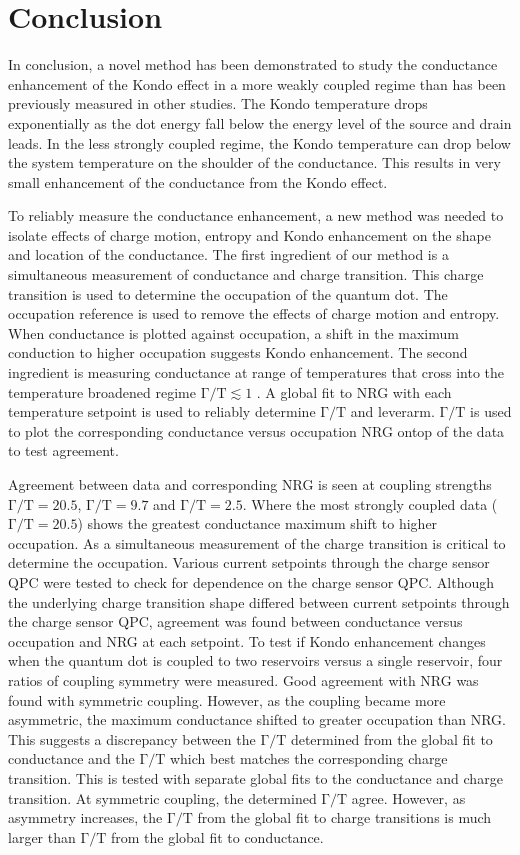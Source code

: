 \chapter{Conclusion}\label{cha:conclusion}


In conclusion, a novel method has been demonstrated to study the conductance enhancement of the Kondo effect in a more weakly coupled regime than has been previously measured in other studies. The Kondo temperature drops exponentially as the dot energy fall below the energy level of the source and drain leads. In the less strongly coupled regime, the Kondo temperature can drop below the system temperature on the shoulder of the conductance. This results in very small enhancement of the conductance from the Kondo effect.

To reliably measure the conductance enhancement, a new method was needed to isolate effects of charge motion, entropy and Kondo enhancement on the shape and location of the conductance. The first ingredient of our method is a simultaneous measurement of conductance and charge transition. This charge transition is used to determine the occupation of the quantum dot. The occupation reference is used to remove the effects of charge motion and entropy. When conductance is plotted against occupation, a shift in the maximum conduction to higher occupation suggests Kondo enhancement. The second ingredient is measuring conductance at range of temperatures that cross into the temperature broadened regime $\mathrm{\Gamma/T} \lesssim 1$ . A global fit to NRG with each temperature setpoint is used to reliably determine $\mathrm{\Gamma/T}$ and leverarm. $\mathrm{\Gamma/T}$ is used to plot the corresponding conductance versus occupation NRG ontop of the data to test agreement. 

Agreement between data and corresponding NRG is seen at coupling strengths $\mathrm{\Gamma/T} = 20.5$, $\mathrm{\Gamma/T} = 9.7$ and $\mathrm{\Gamma/T} = 2.5$. Where the most strongly coupled data ($\mathrm{\Gamma/T} = 20.5$) shows the greatest conductance maximum shift to higher occupation. As a simultaneous measurement of the charge transition is critical to determine the occupation. Various current setpoints through the charge sensor QPC were tested to check for dependence on the charge sensor QPC. Although the underlying charge transition shape differed between current setpoints through the charge sensor QPC, agreement was found between conductance versus occupation and NRG at each setpoint. To test if Kondo enhancement changes when the quantum dot is coupled to two reservoirs versus a single reservoir, four ratios of coupling symmetry were measured.  Good agreement with NRG was found with symmetric coupling. However, as the coupling became more asymmetric, the maximum conductance shifted to greater occupation than NRG. This suggests a discrepancy between the $\mathrm{\Gamma/T}$ determined from the global fit to conductance and the $\mathrm{\Gamma/T}$ which best matches the corresponding charge transition. This is tested with separate global fits to the conductance and charge transition. At symmetric coupling, the determined $\mathrm{\Gamma/T}$ agree. However, as asymmetry increases, the $\mathrm{\Gamma/T}$ from the global fit to charge transitions is much larger than $\mathrm{\Gamma/T}$ from the global fit to conductance. 